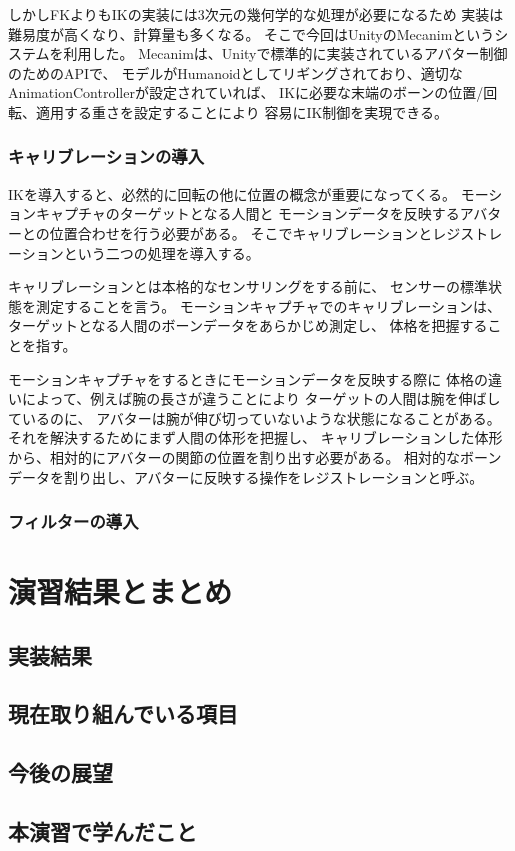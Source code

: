 \documentclass[a4j]{jsarticle}
\begin{document}
しかしFKよりもIKの実装には3次元の幾何学的な処理が必要になるため
実装は難易度が高くなり、計算量も多くなる。
そこで今回はUnityのMecanimというシステムを利用した。
Mecanimは、Unityで標準的に実装されているアバター制御のためのAPIで、
モデルがHumanoidとしてリギングされており、適切なAnimationControllerが設定されていれば、
IKに必要な末端のボーンの位置/回転、適用する重さを設定することにより
容易にIK制御を実現できる。


\subsubsection{キャリブレーションの導入}

IKを導入すると、必然的に回転の他に位置の概念が重要になってくる。
モーションキャプチャのターゲットとなる人間と
モーションデータを反映するアバターとの位置合わせを行う必要がある。
そこでキャリブレーションとレジストレーションという二つの処理を導入する。

キャリブレーションとは本格的なセンサリングをする前に、
センサーの標準状態を測定することを言う。
モーションキャプチャでのキャリブレーションは、
ターゲットとなる人間のボーンデータをあらかじめ測定し、
体格を把握することを指す。

モーションキャプチャをするときにモーションデータを反映する際に
体格の違いによって、例えば腕の長さが違うことにより
ターゲットの人間は腕を伸ばしているのに、
アバターは腕が伸び切っていないような状態になることがある。
それを解決するためにまず人間の体形を把握し、
キャリブレーションした体形から、相対的にアバターの関節の位置を割り出す必要がある。
相対的なボーンデータを割り出し、アバターに反映する操作をレジストレーションと呼ぶ。

\subsubsection{フィルターの導入}

\section{演習結果とまとめ}

\subsection{実装結果}

\subsection{現在取り組んでいる項目}

\subsection{今後の展望}

\subsection{本演習で学んだこと}
\end{document}
